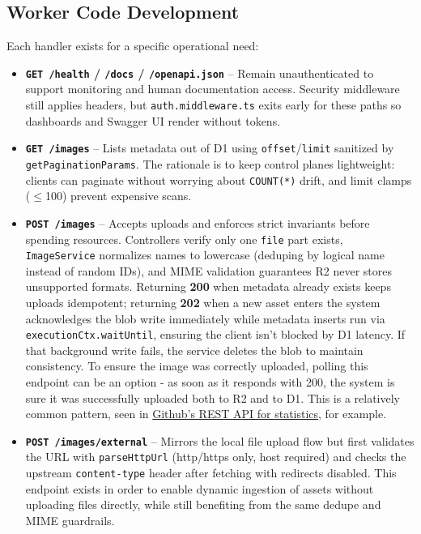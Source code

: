 \documentclass[12pt]{article}
\begin{document}
\subsection{Worker Code Development}
Each handler exists for a specific operational need:
\begin{itemize}[leftmargin=*]
  \item \textbf{\texttt{GET /health} / \texttt{/docs} / \texttt{/openapi.json}} – Remain unauthenticated to support monitoring and human documentation access. Security middleware still applies headers, but \texttt{auth.middleware.ts} exits early for these paths so dashboards and Swagger UI render without tokens.
  \item \textbf{\texttt{GET /images}} – Lists metadata out of D1 using \texttt{offset}/\texttt{limit} sanitized by \texttt{getPaginationParams}. The rationale is to keep control planes lightweight: clients can paginate without worrying about \texttt{COUNT(*)} drift, and limit clamps ($\leq$100) prevent expensive scans.
  \item \textbf{\texttt{POST /images}} – Accepts uploads and enforces strict invariants before spending resources. Controllers verify only one \texttt{file} part exists, \texttt{ImageService} normalizes names to lowercase (deduping by logical name instead of random IDs), and MIME validation guarantees R2 never stores unsupported formats. Returning \textbf{200} when metadata already exists keeps uploads idempotent; returning \textbf{202} when a new asset enters the system acknowledges the blob write immediately while metadata inserts run via \texttt{executionCtx.waitUntil}, ensuring the client isn’t blocked by D1 latency. If that background write fails, the service deletes the blob to maintain consistency. To ensure the image was correctly uploaded, polling this endpoint can be an option - as soon as it responds with 200, the system is sure it was successfully uploaded both to R2 and to D1. This is a relatively common pattern, seen in \href{https://docs.github.com/en/rest/metrics/statistics?apiVersion=2026-03-10}{Github's REST API for statistics}, for example.
  \item \textbf{\texttt{POST /images/external}} – Mirrors the local file upload flow but first validates the URL with \texttt{parseHttpUrl} (http/https only, host required) and checks the upstream \texttt{content-type} header after fetching with redirects disabled. This endpoint exists in order to enable dynamic ingestion of assets without uploading files directly, while still benefiting from the same dedupe and MIME guardrails.

\end{itemize}
\end{document}
